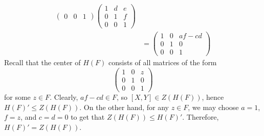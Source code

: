 \begin{sol}
\begin{align*}
\begin{pmatrix}
            0 & 0 & 1
        \end{pmatrix}
        \begin{pmatrix}
            1 & d & e \\
            0 & 1 & f \\
            0 & 0 & 1
        \end{pmatrix} \\
        & =
        \begin{pmatrix}
            1 & 0 & af - cd \\
            0 & 1 & 0 \\
            0 & 0 & 1
        \end{pmatrix}
    \end{align*}
    Recall that the center of $H(F)$ consists of all matrices of the form
    \[
        \begin{pmatrix}
            1 & 0 & z \\
            0 & 1 & 0 \\
            0 & 0 & 1
        \end{pmatrix}
    \]
    for some $z \in F$.
	Clearly, $af - cd \in F$, so $[X, Y] \in Z(H(F))$, hence $H(F)' \leq Z(H(F))$.
	On the other hand, for any $z \in F$, we may choose $a = 1$, $f = z$, and $c = d = 0$ to get that $Z(H(F)) \leq H(F)'$.
	Therefore, $H(F)' = Z(H(F))$.
\end{sol}